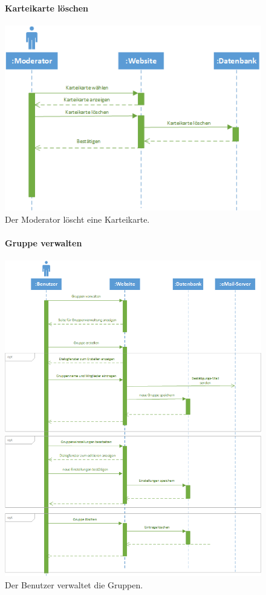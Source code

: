 \documentclass[12pt,a4paper]{article}
\begin{document}
\begin{figure}[H]
	\centering
	\paragraph{Karteikarte löschen}
	\includegraphics[width=\textwidth]{Bilder/Sequenzdiagramme/KarteikarteLoeschen.png}
	\caption{Der Moderator löscht eine Karteikarte.}
	\label{SzKarteikarteLoeschen}
\end{figure}
\begin{figure}[H]
	\centering
	\paragraph{Gruppe verwalten}
	\includegraphics[width=\textwidth]{Bilder/Sequenzdiagramme/GruppenVerwalten.png}
	\caption{Der Benutzer verwaltet die Gruppen.}
	\label{SzGruppenVerwalten}
\end{figure}
\end{document}
